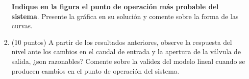 \begin{enumerate}[label=\alph*), start=2]
\textbf{Indique en la figura el punto de operación más probable del sistema}. Presente la gráfica en su solución y comente sobre la forma de las curvas.



    \item (10 puntos) A partir de los resultados anteriores, observe la respuesta del nivel ante los
cambios en el caudal de entrada y la apertura de la válvula de salida, ¿son razonables?
Comente sobre la validez del modelo lineal cuando se producen cambios en el punto
de operación del sistema.


\end{enumerate}

